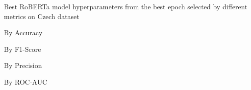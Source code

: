 \begin{table}[!htbp]
    \caption{Best RoBERTa model hyperparameters from the best epoch selected by different metrics on Czech dataset}
    \label{tab:czech_roberta_hparams}
    \centering

    \begin{subtable}[t]{0.48\linewidth}
        \scriptsize
        \caption{By Accuracy}
        
    \end{subtable}
    \hfill
    \begin{subtable}[t]{0.48\linewidth}
        \scriptsize
        \caption{By F1-Score}
        
    \end{subtable}

    \vspace{1em}

    \begin{subtable}[t]{0.48\linewidth}
        \scriptsize
        \caption{By Precision}
        
    \end{subtable}
    \hfill
    \begin{subtable}[t]{0.48\linewidth}
        \scriptsize
        \caption{By ROC-AUC}
        
    \end{subtable}


\end{table}